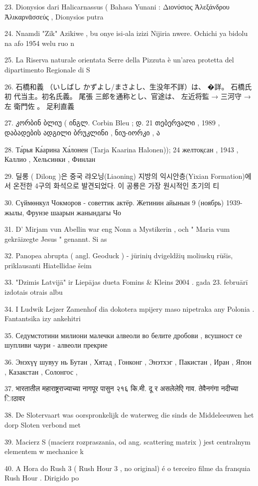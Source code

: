 23. Dionysios dari Halicarnassus ( Bahasa Yunani : Διονύσιος Ἀλεξάνδρου Ἀλικαρνᾱσσεύς
, Dionysios putra

24. Nnamdi "Zik" Azikiwe , bu onye isi-ala izizi Nijiria nwere. Ochichi ya bidolu na afo
1954 welu ruo n

25. La Riserva naturale orientata Serre della Pizzuta è un'area protetta del dipartimento
Regionale di S

26. 石橋和義 （いしばし かずよし/まさよし、生没年不詳）は、 �詳。 石橋氏 初
代当主。初名氏義。 尾張 三郎を通称とし、官途は、 左近将監 → 三河守 → 左
衛門佐 。 足利直義

27. კორბინ ბლიუ ( ინგლ. Corbin Bleu ; დ. 21 თებერვალი , 1989 , დაბადების
ადგილი ბრუკლინი , ნიუ-იორკი , ა

28. Та́рья Ка́арина Ха́лонен (Tarja Kaarina Halonen)); 24 желтоқсан , 1943 , Каллио ,
Хельсинки , Финлан

29. 딜롱 ( Dilong )은 중국 랴오닝(Liaoning) 지방의 익시안층(Yixian Formation)에서
온전한 4구의 화석으로 발견되었다. 이 공룡은 가장 원시적인 초기의 티

30. Сүймөнкул Чокморов - советтик актёр. Жетинин айынын 9 (ноябрь) 1939-жылы,
Фрунзе шаарын жанындагы Чо

31. D' Mirjam vun Abellin war eng Nonn a Mystikerin , och " Maria vum gekräizegte Jesus
" genannt. Si as

32. Panopea abrupta ( angl. Geoduck ) - jūrinių dvigeldžių moliuskų rūšis, priklausanti
Hiatellidae šeim

33. "Dzimis Latvijā" ir Liepājas dueta Fomins & Kleins 2004 . gada 23. februārī izdotais
otrais albu

34. I Ludwik Lejzer Zamenhof dia dokotera mpijery maso nipetraka any Polonia .
Fantantsika izy ankehitri

35. Седумстотини милиони малечки алвеоли во белите дробови , всушност се
шупливи чаури - алвеоли прекрие

36. Энэхүү шувуу нь Бутан , Хятад , Гонконг , Энэтхэг , Пакистан , Иран , Япон ,
Казакстан , Солонгос ,

37. भारतातील महाराष्ट्रराज्याच्या नागपूर पासुन २१६ कि.मी. दू र असलेलेएि गाव. तेवैनगंगा
नदीच्या िाठावर

38. De Slotervaart was oorspronkelijk de waterweg die sinds de Middeleeuwen het dorp
Sloten verbond met

39. Macierz S (macierz rozpraszania, od ang. scattering matrix ) jest centralnym elementem
w mechanice k

40. A Hora do Rush 3 ( Rush Hour 3 , no original) é o terceiro filme da franquia Rush Hour
. Dirigido po


